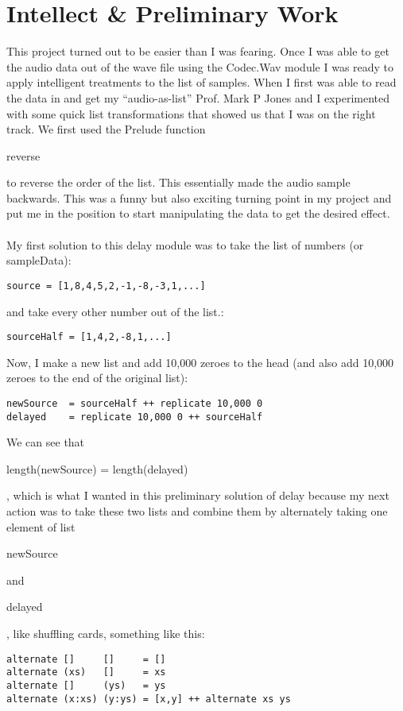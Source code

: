 \documentclass[12pt]{article}
\begin{document}
\section{Intellect \& Preliminary Work}
This project turned out to be easier than I was fearing. Once I was able to get the audio data out of the wave file using the Codec.Wav module I was ready to apply intelligent treatments to the list of samples. When I first was able to read the data in and get my ``audio-as-list'' Prof. Mark P Jones and I experimented with some quick list transformations that showed us that I was on the right track. We first used the Prelude function \begin{tt}reverse\end{tt} to reverse the order of the list. This essentially made the audio sample backwards. This was a funny but also exciting turning point in my project and put me in the position to start manipulating the data to get the desired effect.
\\ \\
My first solution to this delay module was to take the list of numbers (or sampleData):
\begin{verbatim}
source = [1,8,4,5,2,-1,-8,-3,1,...]
\end{verbatim}
and take every other number out of the list.:
\begin{verbatim}
sourceHalf = [1,4,2,-8,1,...]
\end{verbatim}
Now, I make a new list and add 10,000 zeroes to the head (and also add 10,000 zeroes to the end of the original list):
\begin{verbatim}
newSource  = sourceHalf ++ replicate 10,000 0
delayed    = replicate 10,000 0 ++ sourceHalf
\end{verbatim}
We can see that \begin{tt}length(newSource) = length(delayed)\end{tt}, which is what I wanted in this preliminary solution of delay because my next action was to take these two lists and combine them by alternately taking one element of list \begin{tt}newSource\end{tt} and \begin{tt}delayed\end{tt}, like shuffling cards, something like this:
\begin{verbatim}
alternate []     []     = []
alternate (xs)   []     = xs
alternate []     (ys)   = ys
alternate (x:xs) (y:ys) = [x,y] ++ alternate xs ys
\end{verbatim}
\end{document}
